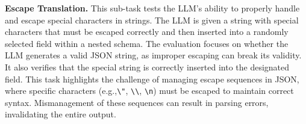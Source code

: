 
\textbf{Escape Translation.} 
This sub-task tests the LLM’s ability to properly handle and escape special characters in strings. The LLM is given a string with special characters that must be escaped correctly and then inserted into a randomly selected field within a nested schema. The evaluation focuses on whether the LLM generates a valid JSON string, as improper escaping can break its validity. It also verifies that the special string is correctly inserted into the designated field. This task highlights the challenge of managing escape sequences in JSON, where specific characters (e.g.,\texttt{\textbackslash "}, \texttt{\textbackslash\textbackslash}, \texttt{\textbackslash n}) must be escaped to maintain correct syntax. Mismanagement of these sequences can result in parsing errors, invalidating the entire output.

